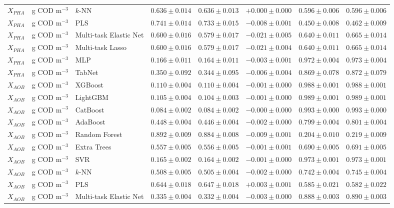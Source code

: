 \begin{longtable}{llp{3.1cm}rrrrr}
$X_{PHA}$ & g COD m$^{-3}$ & $k$-NN & $0.636\pm0.014$ & $0.636\pm0.013$ & $+0.000\pm0.000$ & $0.596\pm0.006$ & $0.596\pm0.006$ \\
$X_{PHA}$ & g COD m$^{-3}$ & PLS & $0.741\pm0.014$ & $0.733\pm0.015$ & $-0.008\pm0.001$ & $0.450\pm0.008$ & $0.462\pm0.009$ \\
$X_{PHA}$ & g COD m$^{-3}$ & Multi-task Elastic Net & $0.600\pm0.016$ & $0.579\pm0.017$ & $-0.021\pm0.005$ & $0.640\pm0.011$ & $0.665\pm0.014$ \\
$X_{PHA}$ & g COD m$^{-3}$ & Multi-task Lasso & $0.600\pm0.016$ & $0.579\pm0.017$ & $-0.021\pm0.004$ & $0.640\pm0.011$ & $0.665\pm0.014$ \\
$X_{PHA}$ & g COD m$^{-3}$ & MLP & $0.166\pm0.011$ & $0.164\pm0.011$ & $-0.003\pm0.001$ & $0.972\pm0.004$ & $0.973\pm0.004$ \\
$X_{PHA}$ & g COD m$^{-3}$ & TabNet & $0.350\pm0.092$ & $0.344\pm0.095$ & $-0.006\pm0.004$ & $0.869\pm0.078$ & $0.872\pm0.079$ \\
$X_{AOB}$ & g COD m$^{-3}$ & XGBoost & $0.110\pm0.004$ & $0.110\pm0.004$ & $-0.001\pm0.000$ & $0.988\pm0.001$ & $0.988\pm0.001$ \\
$X_{AOB}$ & g COD m$^{-3}$ & LightGBM & $0.105\pm0.004$ & $0.104\pm0.003$ & $-0.001\pm0.000$ & $0.989\pm0.001$ & $0.989\pm0.001$ \\
$X_{AOB}$ & g COD m$^{-3}$ & CatBoost & $0.084\pm0.002$ & $0.084\pm0.002$ & $-0.000\pm0.000$ & $0.993\pm0.000$ & $0.993\pm0.000$ \\
$X_{AOB}$ & g COD m$^{-3}$ & AdaBoost & $0.448\pm0.004$ & $0.446\pm0.004$ & $-0.002\pm0.000$ & $0.799\pm0.004$ & $0.801\pm0.004$ \\
$X_{AOB}$ & g COD m$^{-3}$ & Random Forest & $0.892\pm0.009$ & $0.884\pm0.008$ & $-0.009\pm0.001$ & $0.204\pm0.010$ & $0.219\pm0.009$ \\
$X_{AOB}$ & g COD m$^{-3}$ & Extra Trees & $0.557\pm0.005$ & $0.556\pm0.005$ & $-0.001\pm0.001$ & $0.690\pm0.005$ & $0.691\pm0.005$ \\
$X_{AOB}$ & g COD m$^{-3}$ & SVR & $0.165\pm0.002$ & $0.164\pm0.002$ & $-0.001\pm0.000$ & $0.973\pm0.001$ & $0.973\pm0.001$ \\
$X_{AOB}$ & g COD m$^{-3}$ & $k$-NN & $0.508\pm0.005$ & $0.505\pm0.004$ & $-0.002\pm0.000$ & $0.742\pm0.004$ & $0.745\pm0.004$ \\
$X_{AOB}$ & g COD m$^{-3}$ & PLS & $0.644\pm0.018$ & $0.647\pm0.018$ & $+0.003\pm0.001$ & $0.585\pm0.021$ & $0.582\pm0.022$ \\
$X_{AOB}$ & g COD m$^{-3}$ & Multi-task Elastic Net & $0.335\pm0.004$ & $0.332\pm0.004$ & $-0.003\pm0.000$ & $0.888\pm0.003$ & $0.890\pm0.003$ \\

\end{longtable}
